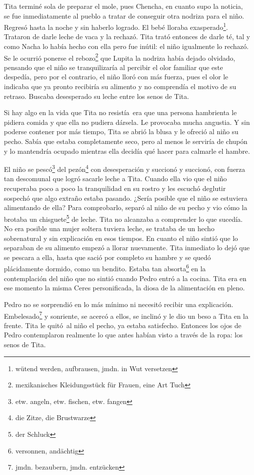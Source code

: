 Tita terminé sola de preparar el mole, pues Chencha, en cuanto supo la
noticia, se fue inmediatamente al pueblo a tratar de conseguir otra
nodriza para el niño. Regresó hasta la noche y sin haberlo logrado. El
bebé lloraba exasperado\footnote{wütend werden, aufbrausen, jmdn. in Wut versetzen}.
Trataron de darle leche de vaca y la rechazó.
Tita trató entonces de darle té, tal y como Nacha lo había hecho con
ella pero fue inútil: el niño igualmente lo rechazó. Se le ocurrió
ponerse el rebozo\footnote{mexikanisches Kleidungsstück für Frauen, eine Art Tuch}
que Lupita la nodriza había dejado olvidado, pensando
que el niño se tranquilizaría al percibir el olor familiar que este
despedía, pero por el contrario, el niño lloró con más fuerza, pues el
olor le indicaba que ya pronto recibiría su alimento y no comprendía el
motivo de su retraso. Buscaba desesperado su leche entre los senos de
Tita.

Si hay algo en la vida que Tita no resistía~era que una persona
hambrienta le pidiera comida y que ella no pudiera dársela. Le provocaba
mucha angustia. Y sin poderse contener por más tiempo, Tita se abrió la
blusa y le ofreció al niño su pecho. Sabía que estaba completamente
seco, pero al menos le serviría de chupón y lo mantendría ocupado
mientras ella decidía qué hacer para calmarle el hambre.

El niño se pescó\footnote{etw. angeln, etw. fischen, etw. fangen}
del pezón\footnote{die Zitze, die Brustwarze} con desesperación
y succionó y succionó, con fuerza tan descomunal que logró sacarle leche
a Tita. Cuando ella vio que el niño recuperaba poco a poco la tranquilidad
en su rostro y les escuchó deglutir sospechó que algo extraño estaba pasando.
¿Sería posible que el niño se estuviera alimentando de ella? Para comprobarlo,
separó al niño de su pecho y vio cómo la brotaba un chisguete\footnote{der Schluck}
de leche.
Tita no alcanzaba a comprender lo que sucedía. No era posible una mujer
soltera tuviera leche, se trataba de un hecho sobrenatural y sin
explicación en esos tiempos. En cuanto el niño sintió que lo separaban
de su alimento empezó a llorar nuevamente. Tita inmediato lo dejó que se
pescara a ella, hasta que sació por completo su hambre y se quedó
plácidamente dormido, como un bendito. Estaba tan absorta\footnote{versonnen, andächtig} en la contemplación del
niño que no sintió cuando Pedro entró a la cocina.
Tita era en ese momento la misma Ceres personificada, la diosa de la
alimentación en pleno.

Pedro no se sorprendió en lo más mínimo ni necesitó recibir una
explicación. Embelesado\footnote{jmdn. bezaubern, jmdn. entzücken}
y sonriente, se acercó a ellos, se inclinó y le dio un beso a Tita en la frente.
Tita le quitó~al niño el pecho, ya estaba satisfecho. Entonces los ojos
de Pedro contemplaron realmente lo que antes habían visto a través de la
ropa: los senos de Tita.

